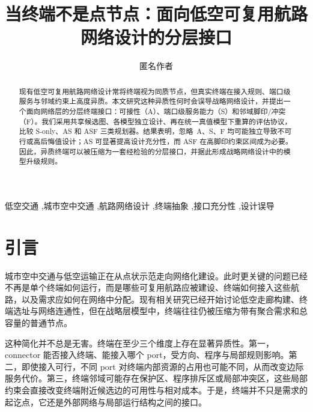 \documentclass[review,authoryear]{elsarticle}
\begin{document}
\begin{frontmatter}

\title{当终端不是点节点：面向低空可复用航路网络设计的分层接口}

\author[inst1]{匿名作者}


\begin{abstract}
现有低空可复用航路网络设计常将终端视为同质节点，但真实终端在接入规则、端口级服务与邻域约束上高度异质。本文研究这种异质性何时会误导战略网络设计，并提出一个面向网络层的分层终端接口：可接性（A）、端口级服务能力（S）和邻域脚印/冲突（F）。我们采用共享候选图、各模型独立设计、再在统一真值模型下重算的评估协议，比较 S-only、AS 和 ASF 三类规划器。结果表明，忽略~A、S、F 均可能独立导致不可行或高后悔值设计；AS 可显著提高设计充分性，而 ASF 在高脚印约束区间成为必要。因此，异质终端可以被压缩为一套经检验的分层接口，并据此形成战略网络设计中的模型升级规则。
\end{abstract}

\begin{keyword}
低空交通 \sep 城市空中交通 \sep 航路网络设计 \sep 终端抽象 \sep 接口充分性 \sep 设计误导
\end{keyword}

\end{frontmatter}

\section{引言}
\label{sec:introduction}

城市空中交通与低空运输正在从点状示范走向网络化建设。此时更关键的问题已经不再是单个终端如何运行，而是哪些可复用航路应被建设、终端如何接入这些航路，以及需求应如何在网络中分配。现有相关研究已经开始讨论低空走廊构建、终端选址与网络连通性，但在战略层模型中，终端往往仍被压缩为带有聚合需求和总容量的普通节点。

这种简化并不总是无害。终端在至少三个维度上存在显著异质性。第一，connector 能否接入终端、能接入哪个 port，受方向、程序与局部规则影响。第二，即使接入可行，不同 port 对终端内部资源的占用也可能不同，从而改变边际服务代价。第三，终端邻域可能存在保护区、程序排斥区或局部冲突区，这些局部约束会直接改变终端附近候选边的可用性与相对成本。于是，终端并不只是需求的起讫点，它还是外部网络与局部运行结构之间的接口。
\end{document}
